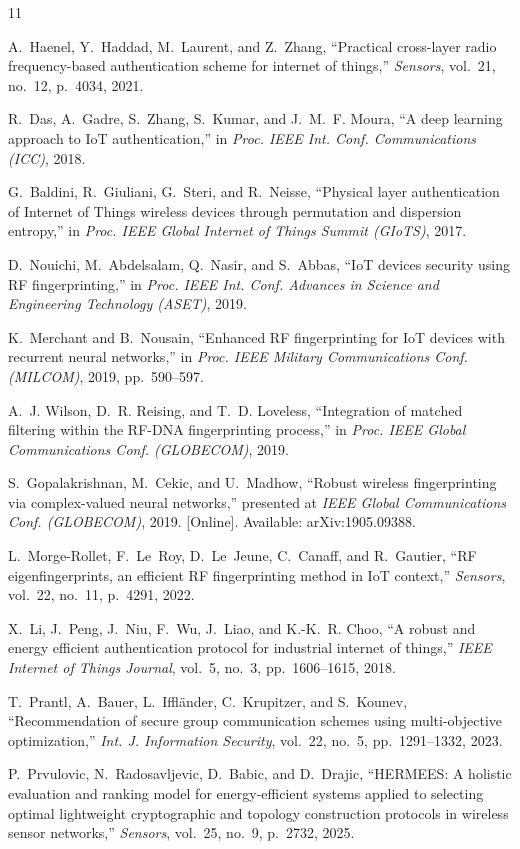 \documentclass[conference]{IEEEtran}
\begin{document}
\begin{thebibliography}{11}

A.~Haenel, Y.~Haddad, M.~Laurent, and Z.~Zhang, ``Practical cross-layer radio frequency-based authentication scheme for internet of things,'' \emph{Sensors}, vol.~21, no.~12, p.~4034, 2021.

R.~Das, A.~Gadre, S.~Zhang, S.~Kumar, and J.~M.~F. Moura, ``A deep learning approach to IoT authentication,'' in \emph{Proc. IEEE Int. Conf. Communications (ICC)}, 2018.

G.~Baldini, R.~Giuliani, G.~Steri, and R.~Neisse, ``Physical layer authentication of Internet of Things wireless devices through permutation and dispersion entropy,'' in \emph{Proc. IEEE Global Internet of Things Summit (GIoTS)}, 2017.

D.~Nouichi, M.~Abdelsalam, Q.~Nasir, and S.~Abbas, ``IoT devices security using RF fingerprinting,'' in \emph{Proc. IEEE Int. Conf. Advances in Science and Engineering Technology (ASET)}, 2019.

K.~Merchant and B.~Nousain, ``Enhanced RF fingerprinting for IoT devices with recurrent neural networks,'' in \emph{Proc. IEEE Military Communications Conf. (MILCOM)}, 2019, pp.~590--597.

A.~J. Wilson, D.~R. Reising, and T.~D. Loveless, ``Integration of matched filtering within the RF-DNA fingerprinting process,'' in \emph{Proc. IEEE Global Communications Conf. (GLOBECOM)}, 2019.

S.~Gopalakrishnan, M.~Cekic, and U.~Madhow, ``Robust wireless fingerprinting via complex-valued neural networks,'' presented at \emph{IEEE Global Communications Conf. (GLOBECOM)}, 2019. [Online]. Available: arXiv:1905.09388.

L.~Morge-Rollet, F.~Le~Roy, D.~Le~Jeune, C.~Canaff, and R.~Gautier, ``RF eigenfingerprints, an efficient RF fingerprinting method in IoT context,'' \emph{Sensors}, vol.~22, no.~11, p.~4291, 2022.

X.~Li, J.~Peng, J.~Niu, F.~Wu, J.~Liao, and K.-K.~R. Choo, ``A robust and energy efficient authentication protocol for industrial internet of things,'' \emph{IEEE Internet of Things Journal}, vol.~5, no.~3, pp.~1606--1615, 2018.

T.~Prantl, A.~Bauer, L.~Iffl\"ander, C.~Krupitzer, and S.~Kounev, ``Recommendation of secure group communication schemes using multi-objective optimization,'' \emph{Int. J. Information Security}, vol.~22, no.~5, pp.~1291--1332, 2023.

P.~Prvulovic, N.~Radosavljevic, D.~Babic, and D.~Drajic, ``HERMEES: A holistic evaluation and ranking model for energy-efficient systems applied to selecting optimal lightweight cryptographic and topology construction protocols in wireless sensor networks,'' \emph{Sensors}, vol.~25, no.~9, p.~2732, 2025.

\end{thebibliography}
\end{document}
